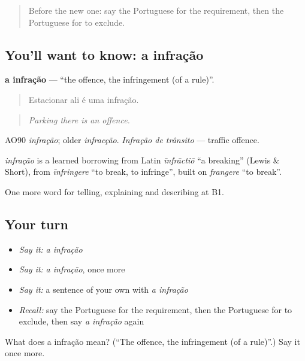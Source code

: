 \begin{quote}
Before the new one: say the Portuguese for the requirement, then the Portuguese for to exclude.
\end{quote}

\subsection*{You'll want to know: a infração}
\textbf{a infração} — \textquotedblleft{}the offence, the infringement (of a rule)\textquotedblright{}.

\begin{quote}
Estacionar ali é uma infração.
\end{quote}

\begin{quote}
\emph{Parking there is an offence.}
\end{quote}

AO90 \emph{infração}; older \emph{infracção}. \emph{Infração de trânsito} — traffic offence.

\begin{cousinweb}
\emph{infração} is a learned borrowing from Latin \emph{īnfrāctiō} \textquotedblleft{}a breaking\textquotedblright{} (Lewis \& Short), from \emph{īnfringere} \textquotedblleft{}to break, to infringe\textquotedblright{}, built on \emph{frangere} \textquotedblleft{}to break\textquotedblright{}.
\end{cousinweb}

\begin{grammarlens}[title={What you've built}]
One more word for telling, explaining and describing at B1.
\end{grammarlens}

\subsection*{Your turn}
\begin{itemize}
\raggedright
  \item \emph{Say it:} \emph{a infração}
  \item \emph{Say it:} \emph{a infração}, once more
  \item \emph{Say it:} a sentence of your own with \emph{a infração}
  \item \emph{Recall:} say the Portuguese for the requirement, then the Portuguese for to exclude, then say \emph{a infração} again
\end{itemize}

\begin{tcolorbox}[breakable,colback=teal!4,colframe=teal!35!black,title={Before you move on}]
What does a infração mean? (\textquotedblleft{}The offence, the infringement (of a rule)\textquotedblright{}.) Say it once more.
\end{tcolorbox}
